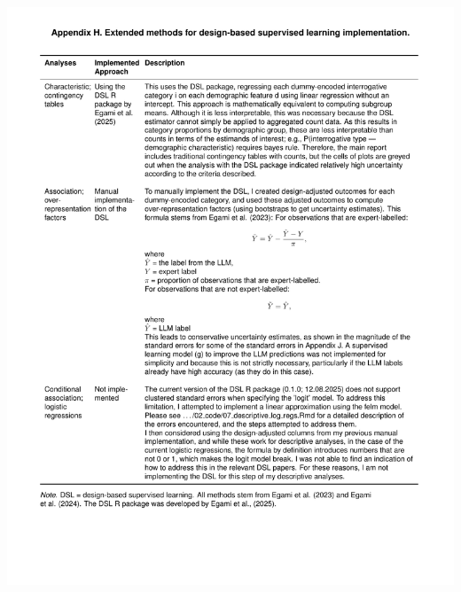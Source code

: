 \documentclass[
  12pt,
]{article}
\begin{document}
\includegraphics{../03_outputs/04_appendices/appendix_h.pdf}
\end{document}
